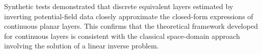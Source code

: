 Synthetic tests demonstrated that discrete equivalent layers estimated by inverting 
potential-field data closely approximate the closed-form expressions of continuous 
planar layers. This confirms that the theoretical framework developed for continuous 
layers is consistent with the classical space-domain approach involving the solution of 
a linear inverse problem.